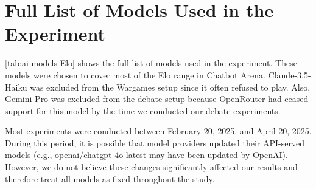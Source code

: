 \documentclass{article}
\begin{document}
\section{Full List of Models Used in the Experiment}
\label{app:list-models}
\cref{tab:ai-models-Elo} shows the full list of models used in the experiment. These models were chosen to cover most of the Elo range in Chatbot Arena. Claude-3.5-Haiku was excluded from the Wargames setup since it often refused to play. Also, Gemini-Pro was excluded from the debate setup because OpenRouter had ceased support for this model by the time we conducted our debate experiments.

Most experiments were conducted between February 20, 2025, and April 20, 2025. During this period, it is possible that model providers updated their API-served models (e.g., openai/chatgpt-4o-latest may have been updated by OpenAI). However, we do not believe these changes significantly affected our results and therefore treat all models as fixed throughout the study.
\end{document}
